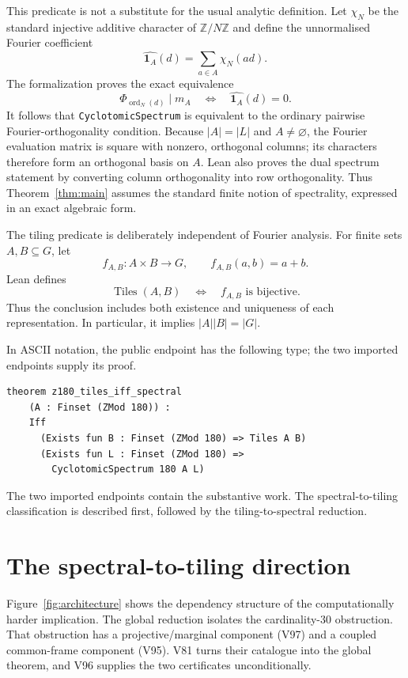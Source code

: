 \documentclass[10pt,twocolumn]{article}
\theoremstyle{definition}
\theoremstyle{remark}
\newcommand{\Z}{\mathbb Z}
\newcommand{\Zmod}[1]{\Z/#1\Z}
\newcommand{\mask}{m_A}
\begin{document}
This predicate is not a substitute for the usual analytic definition.  Let
$\chi_N$ be the standard injective additive character of $\Zmod N$ and define
the unnormalised Fourier coefficient
\[
  \widehat{\mathbf 1_A}(d)=\sum_{a\in A}\chi_N(ad).
\]
The formalization proves the exact equivalence
\begin{equation}\label{eq:fourier-bridge}
  \Phi_{\operatorname{ord}_N(d)}\mid \mask
  \quad\Longleftrightarrow\quad
  \widehat{\mathbf 1_A}(d)=0.
\end{equation}
It follows that \texttt{CyclotomicSpectrum} is equivalent to the ordinary
pairwise Fourier-orthogonality condition.  Because $|A|=|L|$ and
$A\ne\varnothing$, the Fourier evaluation matrix is square with nonzero,
orthogonal columns; its characters therefore form an orthogonal basis on
$A$.  Lean also proves the dual spectrum statement by converting column
orthogonality into row orthogonality.  Thus Theorem~\ref{thm:main} assumes the
standard finite notion of spectrality, expressed in an exact algebraic form.

The tiling predicate is deliberately independent of Fourier analysis.
For finite sets $A,B\subseteq G$, let
\[
  f_{A,B}:A\times B\longrightarrow G,
  \qquad f_{A,B}(a,b)=a+b.
\]
Lean defines
\[
  \operatorname{Tiles}(A,B)
  \quad\Longleftrightarrow\quad
  f_{A,B}\text{ is bijective}.
\]
Thus the conclusion includes both existence and uniqueness of each
representation.  In particular, it implies $|A||B|=|G|$.

In ASCII notation, the public endpoint has the following type; the two imported
endpoints supply its proof.

\begin{lstlisting}
theorem z180_tiles_iff_spectral
    (A : Finset (ZMod 180)) :
    Iff
      (Exists fun B : Finset (ZMod 180) => Tiles A B)
      (Exists fun L : Finset (ZMod 180) =>
        CyclotomicSpectrum 180 A L)
\end{lstlisting}

The two imported endpoints contain the substantive work.  The
spectral-to-tiling classification is described first, followed by the
tiling-to-spectral reduction.

\section{The spectral-to-tiling direction}

Figure~\ref{fig:architecture} shows the dependency structure of the
computationally harder implication.  The global
reduction isolates the cardinality-$30$ obstruction.  That obstruction has a
projective/marginal component (V97) and a coupled common-frame component
(V95).  V81 turns their catalogue into the global theorem, and V96 supplies
the two certificates unconditionally.
\end{document}
